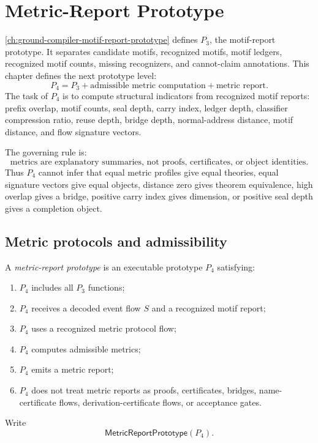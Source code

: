 \chapter{Metric-Report Prototype}
\label{ch:ground-compiler-metric-report-prototype}

\autoref{ch:ground-compiler-motif-report-prototype} defines $P_3$, the motif-report prototype. It separates candidate motifs, recognized motifs, motif ledgers, recognized motif counts, missing recognizers, and cannot-claim annotations. This chapter defines the next prototype level:
$$
  \boxed{P_4=P_3+\text{admissible metric computation}+\text{metric report}.}
$$
The task of $P_4$ is to compute structural indicators from recognized motif reports: prefix overlap, motif counts, seal depth, carry index, ledger depth, classifier compression ratio, reuse depth, bridge depth, normal-address distance, motif distance, and flow signature vectors.

The governing rule is:
$$
  \boxed{\text{metrics are explanatory summaries, not proofs, certificates, or object identities}.}
$$
Thus $P_4$ cannot infer that equal metric profiles give equal theories, equal signature vectors give equal objects, distance zero gives theorem equivalence, high overlap gives a bridge, positive carry index gives dimension, or positive seal depth gives a completion object.

\section{Metric protocols and admissibility}
\label{sec:metric-report-protocols-admissibility}

\begin{definition}
\label{def:metric-report-prototype}
A \emph{metric-report prototype} is an executable prototype $P_4$ satisfying:
\begin{enumerate}
\item $P_4$ includes all $P_3$ functions;
\item $P_4$ receives a decoded event flow $S$ and a recognized motif report;
\item $P_4$ uses a recognized metric protocol flow;
\item $P_4$ computes admissible metrics;
\item $P_4$ emits a metric report;
\item $P_4$ does not treat metric reports as proofs, certificates, bridges, name-certificate flows, derivation-certificate flows, or acceptance gates.
\end{enumerate}
Write
$$
  \mathsf{MetricReportPrototype}(P_4).
$$
\end{definition}

